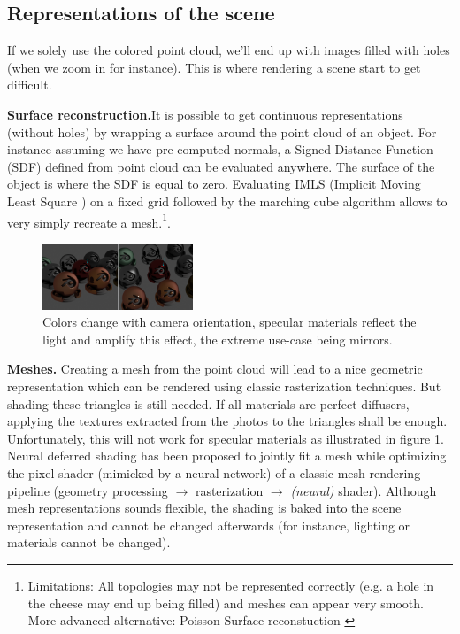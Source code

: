 \subsection{Representations of the scene}
\label{sec:representations}

If we solely use the colored point cloud, we'll end up with images filled with holes (when we zoom in for instance).
This is where rendering a scene start to get difficult.

\noindent\textbf{Surface reconstruction.}It is possible to get continuous representations (without holes) by wrapping a surface around the point cloud of an object. For instance assuming we have pre-computed normals, a Signed Distance Function (SDF) defined from point cloud can be evaluated anywhere. The surface of the object is where the SDF is equal to zero. Evaluating IMLS (Implicit Moving Least Square \cite{kolluri2008IMLS}) on a fixed grid followed by the marching cube algorithm allows to very simply recreate a mesh.\footnote{Limitations: All topologies may not be represented correctly (e.g. a hole in the cheese may end up being filled) and meshes can appear very smooth. More advanced alternative: Poisson Surface reconstuction \cite{kazhdan2006poisson}}.


\begin{figure}[htbp]
    \centering
    \includegraphics[width=0.4\textwidth]{figures/material_appearance_commented.png}
    \caption{Colors change with camera orientation, specular materials reflect the light and amplify this effect, the extreme use-case being mirrors.}
    \label{fig:material_changes}
\end{figure}

\noindent\textbf{Meshes.} Creating a mesh from the point cloud will lead to a nice geometric representation which can be rendered using classic rasterization techniques. But shading these triangles is still needed. If all materials are perfect diffusers, applying the textures extracted from the photos to the triangles shall be enough. Unfortunately, this will not work for specular materials as illustrated in figure \ref{fig:material_changes}. Neural deferred shading has been proposed \cite{worchel2022nds} to jointly fit a mesh while optimizing the pixel shader (mimicked by a neural network) of a classic mesh rendering pipeline (geometry processing $\rightarrow$ rasterization $\rightarrow$ \textit{(neural)} shader). Although mesh representations sounds flexible, the shading is baked into the scene representation and cannot be changed afterwards (for instance, lighting or materials cannot be changed).

